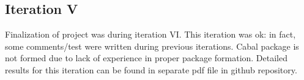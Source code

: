 \subsection{Iteration V}
Finalization of project was during iteration VI. This iteration was ok: in fact, some comments/test were written during previous iterations. Cabal package is not formed due to lack of experience in proper package formation.
Detailed results for this iteration can be found in separate pdf file\cite{khazhix6} in github repository.